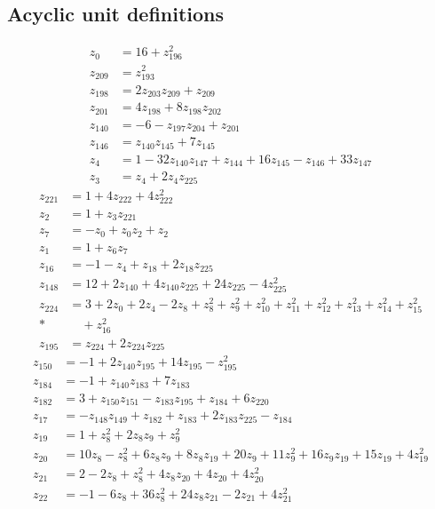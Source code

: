 \subsection*{Acyclic unit definitions}
\begin{align*}
z_{0}&=16+z_{196}^{2}\\[3pt]
z_{209}&=z_{193}^{2}\\[3pt]
z_{198}&=2z_{203} z_{209}+z_{209}\\[3pt]
z_{201}&=4z_{198}+8z_{198} z_{202}\\[3pt]
z_{140}&=-6-z_{197} z_{204}+z_{201}\\[3pt]
z_{146}&=z_{140} z_{145}+7z_{145}\\[3pt]
z_{4}&=1-32z_{140} z_{147}+z_{144}+16z_{145}-z_{146}+33z_{147}\\[3pt]
z_{3}&=z_{4}+2z_{4} z_{225}
\end{align*}
\begin{align*}
z_{221}&=1+4z_{222}+4z_{222}^{2}\\[3pt]
z_{2}&=1+z_{3} z_{221}\\[3pt]
z_{7}&=-z_{0}+z_{0} z_{2}+z_{2}\\[3pt]
z_{1}&=1+z_{6} z_{7}\\[3pt]
z_{16}&=-1-z_{4}+z_{18}+2z_{18} z_{225}\\[3pt]
z_{148}&=12+2z_{140}+4z_{140} z_{225}+24z_{225}-4z_{225}^{2}\\[3pt]
z_{224}&=3+2z_{0}+2z_{4}-2z_{8}+z_{8}^{2}+z_{9}^{2}+z_{10}^{2}+z_{11}^{2}+z_{12}^{2}+z_{13}^{2}+z_{14}^{2}+z_{15}^{2}\\*
&\quad{}+z_{16}^{2}\\[3pt]
z_{195}&=z_{224}+2z_{224} z_{225}
\end{align*}
\begin{align*}
z_{150}&=-1+2z_{140} z_{195}+14z_{195}-z_{195}^{2}\\[3pt]
z_{184}&=-1+z_{140} z_{183}+7z_{183}\\[3pt]
z_{182}&=3+z_{150} z_{151}-z_{183} z_{195}+z_{184}+6z_{220}\\[3pt]
z_{17}&=-z_{148} z_{149}+z_{182}+z_{183}+2z_{183} z_{225}-z_{184}\\[3pt]
z_{19}&=1+z_{8}^{2}+2z_{8} z_{9}+z_{9}^{2}\\[3pt]
z_{20}&=10z_{8}-z_{8}^{2}+6z_{8} z_{9}+8z_{8} z_{19}+20z_{9}+11z_{9}^{2}+16z_{9} z_{19}+15z_{19}+4z_{19}^{2}\\[3pt]
z_{21}&=2-2z_{8}+z_{8}^{2}+4z_{8} z_{20}+4z_{20}+4z_{20}^{2}\\[3pt]
z_{22}&=-1-6z_{8}+36z_{8}^{2}+24z_{8} z_{21}-2z_{21}+4z_{21}^{2}
\end{align*}
